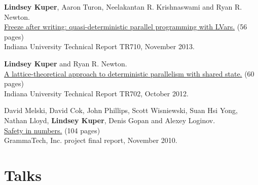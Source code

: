 \documentclass[10pt,letterpaper]{article}
\newenvironment{itemize*}
  {\begin{itemize}
      \setlength{\itemsep}{1pt}
      \setlength{\parskip}{3pt}
  }
  {\end{itemize}}
\begin{document}
\begin{itemize*}
\item
  \textbf{Lindsey Kuper}, Aaron Turon, Neelakantan R. Krishnaswami
  and Ryan R. Newton. \\
  \href{http://www.cs.indiana.edu/cgi-bin/techreports/TRNNN.cgi?trnum=TR710}{Freeze
    after writing: quasi-deterministic parallel programming with LVars.} (56 pages) \\
  Indiana University Technical Report TR710, November 2013.

\item 
  \textbf{Lindsey Kuper} and Ryan R. Newton. \\
  \href{http://www.cs.indiana.edu/cgi-bin/techreports/TRNNN.cgi?trnum=TR702}{A
    lattice-theoretical approach to deterministic parallelism with
    shared state.} (60 pages) \\
  Indiana University Technical Report TR702, October 2012.

\item David Melski, David Cok, John Phillips, Scott Wisniewski, Suan
  Hsi Yong, Nathan Lloyd, \textbf{Lindsey Kuper}, Denis Gopan and
  Alexey Loginov. \\
  \href{http://www.dtic.mil/dtic/tr/fulltext/u2/a532995.pdf}{Safety in
    numbers.} (104 pages) \\
  GrammaTech, Inc. project final report, November 2010.
\end{itemize*}

\newpage

\section*{Talks}
\end{document}
